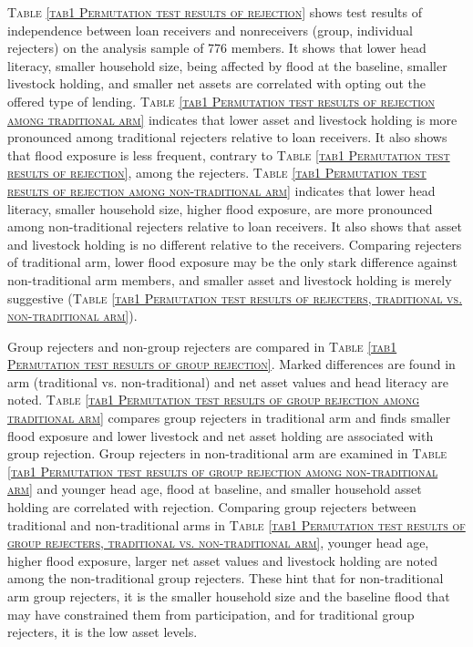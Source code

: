 	\textsc{\normalsize Table \ref{tab1 Permutation test results of rejection}} shows test results of independence between loan receivers and nonreceivers (group, individual rejecters) on the analysis sample of 776 members. It shows that lower head literacy, smaller household size, being affected by flood at the baseline, smaller livestock holding, and smaller net assets are correlated with opting out the offered type of lending. \textsc{\normalsize Table \ref{tab1 Permutation test results of rejection among traditional arm}} indicates that lower asset and livestock holding is more pronounced among \textsf{traditional} rejecters relative to loan receivers. It also shows that flood exposure is less frequent, contrary to \textsc{\normalsize Table \ref{tab1 Permutation test results of rejection}}, among the rejecters. \textsc{\normalsize Table \ref{tab1 Permutation test results of rejection among non-traditional arm}} indicates that lower head literacy, smaller household size, higher flood exposure, are more pronounced among non-\textsf{traditional} rejecters relative to loan receivers. It also shows that asset and livestock holding is no different relative to the receivers. Comparing rejecters of \textsf{traditional} arm, lower flood exposure may be the only stark difference against non-\textsf{traditional} arm members, and smaller asset and livestock holding is merely suggestive (\textsc{\normalsize Table \ref{tab1 Permutation test results of rejecters, traditional vs. non-traditional arm}}). 
	
	Group rejecters and non-group rejecters are compared in \textsc{\normalsize Table \ref{tab1 Permutation test results of group rejection}}. Marked differences are found in arm (\textsf{traditional} vs. non-\textsf{traditional}) and net asset values and head literacy are noted. \textsc{\normalsize Table \ref{tab1 Permutation test results of group rejection among traditional arm}} compares group rejecters in \textsf{traditional} arm and finds smaller flood exposure and lower livestock and net asset holding are associated with group rejection. Group rejecters in non-\textsf{traditional} arm are examined in \textsc{\normalsize Table \ref{tab1 Permutation test results of group rejection among non-traditional arm}} and younger head age, flood at baseline, and smaller household asset holding are correlated with rejection. Comparing group rejecters between \textsf{traditional} and non-\textsf{traditional} arms in \textsc{\normalsize Table \ref{tab1 Permutation test results of group rejecters, traditional vs. non-traditional arm}}, younger head age, higher flood exposure, larger net asset values and livestock holding are noted among the non-\textsf{traditional} group rejecters. These hint that for non-\textsf{traditional} arm group rejecters, it is the smaller household size and the baseline flood that may have constrained them from participation, and for \textsf{traditional} group rejecters, it is the low asset levels.


